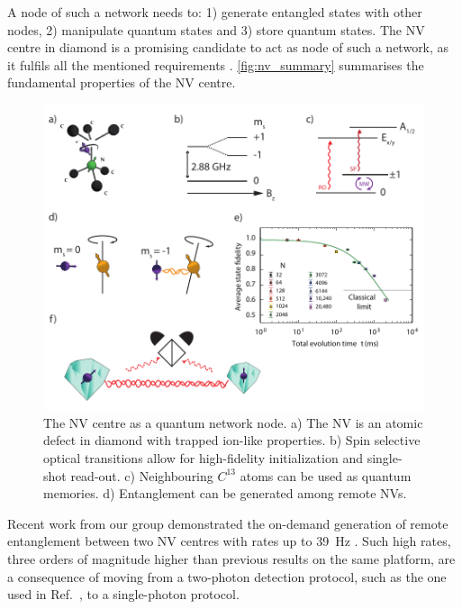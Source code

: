 \documentclass[a4paper, twoside]{article}
\begin{document}
A node of such a network needs to: 1) generate entangled states with other nodes, 2) manipulate quantum states and 3) store quantum states. The \ac{NV} centre in diamond is a promising candidate to act as node of such a network, as it fulfils all the mentioned requirements \cite{Awschalom2018}. \autoref{fig:nv_summary} summarises the fundamental properties of the \ac{NV} centre.

\begin{figure}
	\includegraphics[width=\textwidth]{images/figure1}
	\caption{The \ac{NV} centre as a quantum network node. a) The \ac{NV} is an atomic defect in diamond with trapped ion-like properties. b) Spin selective optical transitions allow for high-fidelity initialization and single-shot read-out. c) Neighbouring $C^{13}$ atoms can be used as quantum memories. d) Entanglement can be generated among remote \acp{NV}.}
	\label{fig:nv_summary}
\end{figure}

Recent work from our group demonstrated the on-demand generation of remote entanglement between two \ac{NV} centres with rates up to \SI{39}{\Hz} \cite{Humphreys2018}. Such high rates, three orders of magnitude higher than previous results on the same platform, are a consequence of moving from a two-photon detection protocol, such as the one used in Ref.~\cite{Hensen2015}, to a single-photon protocol.
\end{document}
